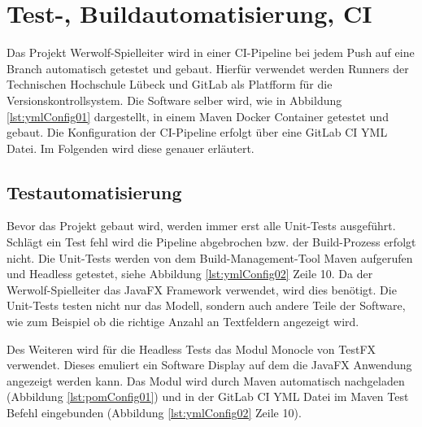 \chapter{Test-, Buildautomatisierung, CI}

Das Projekt Werwolf-Spielleiter wird in einer CI-Pipeline bei jedem Push auf eine Branch automatisch getestet und gebaut. Hierfür verwendet werden Runners der Technischen Hochschule Lübeck und GitLab als Platfform für die Versionskontrollsystem. Die Software selber wird, wie in Abbildung \ref{lst:ymlConfig01} dargestellt, in einem Maven Docker Container getestet und gebaut. Die Konfiguration der CI-Pipeline erfolgt über eine GitLab CI YML Datei. Im Folgenden wird diese genauer erläutert.

\medskip
\begin{center}
	\begin{minipage}{0.7\textwidth}
		
	\end{minipage}
\end{center}

\section{Testautomatisierung}

Bevor das Projekt gebaut wird, werden immer erst alle Unit-Tests ausgeführt. Schlägt ein Test fehl wird die Pipeline abgebrochen bzw. der Build-Prozess erfolgt nicht. Die Unit-Tests werden von dem Build-Management-Tool Maven aufgerufen und Headless getestet, siehe Abbildung \ref{lst:ymlConfig02} Zeile 10. Da der Werwolf-Spielleiter das JavaFX Framework verwendet, wird dies benötigt. Die Unit-Tests testen nicht nur das Modell, sondern auch andere Teile der Software, wie zum Beispiel ob die richtige Anzahl an Textfeldern angezeigt wird.

\medskip
\begin{center}
	\begin{minipage}{0.7\textwidth}
		
	\end{minipage}
\end{center}

Des Weiteren wird für die Headless Tests das Modul Monocle von TestFX verwendet. Dieses emuliert ein Software Display auf dem die JavaFX Anwendung angezeigt werden kann. Das Modul wird durch Maven automatisch nachgeladen (Abbildung \ref{lst:pomConfig01}) und in der GitLab CI YML Datei im Maven Test Befehl eingebunden (Abbildung \ref{lst:ymlConfig02} Zeile 10).

